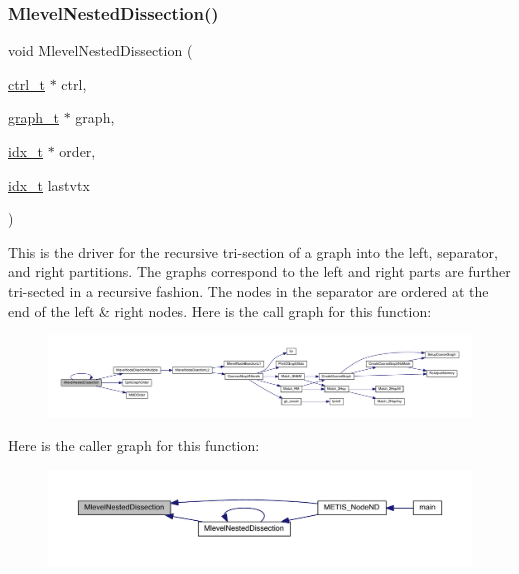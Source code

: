\mbox{\label{a00933_af853e9d8bbb2188f871fac436e631ed1}} 
\subsubsection{\texorpdfstring{Mlevel\+Nested\+Dissection()}{MlevelNestedDissection()}}
{\footnotesize\ttfamily void Mlevel\+Nested\+Dissection (\begin{DoxyParamCaption}\item[{\hyperlink{a00742}{ctrl\+\_\+t} $\ast$}]{ctrl,  }\item[{\hyperlink{a00734}{graph\+\_\+t} $\ast$}]{graph,  }\item[{\hyperlink{a00876_aaa5262be3e700770163401acb0150f52}{idx\+\_\+t} $\ast$}]{order,  }\item[{\hyperlink{a00876_aaa5262be3e700770163401acb0150f52}{idx\+\_\+t}}]{lastvtx }\end{DoxyParamCaption})}

This is the driver for the recursive tri-\/section of a graph into the left, separator, and right partitions. The graphs correspond to the left and right parts are further tri-\/sected in a recursive fashion. The nodes in the separator are ordered at the end of the left \& right nodes. Here is the call graph for this function\+:\nopagebreak
\begin{figure}[H]
\begin{center}
\leavevmode
\includegraphics[width=350pt]{a00933_af853e9d8bbb2188f871fac436e631ed1_cgraph}
\end{center}
\end{figure}
Here is the caller graph for this function\+:\nopagebreak
\begin{figure}[H]
\begin{center}
\leavevmode
\includegraphics[width=350pt]{a00933_af853e9d8bbb2188f871fac436e631ed1_icgraph}
\end{center}
\end{figure}
\mbox{\label{a00933_a3ef15d1ffff55a81b8486bee09239073}} 
